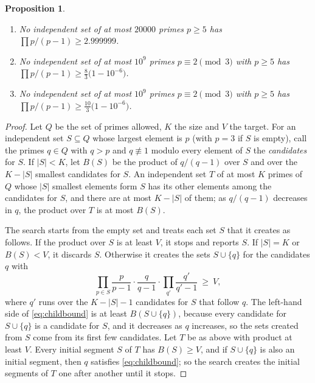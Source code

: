 \documentclass[11pt,reqno]{amsart}
\numberwithin{equation}{section}
\theoremstyle{plain}
\newtheorem{proposition}[theorem]{Proposition}
\theoremstyle{definition}
\theoremstyle{remark}
\begin{document}
\begin{proposition}\label{prop:indep}
\begin{enumerate}[label=\textup{(\roman*)}]
\item No independent set of at most $20000$ primes $p\ge5$ has
  $\prod p/(p-1)\ge2.999999$.
\item No independent set of at most $10^9$ primes $p\equiv2\pmod3$
  with $p\ge5$ has $\prod p/(p-1)\ge\frac83\bigl(1-10^{-6}\bigr)$.
\item No independent set of at most $10^9$ primes $p\equiv2\pmod3$
  with $p\ge5$ has $\prod p/(p-1)\ge\frac{10}3\bigl(1-10^{-6}\bigr)$.
\end{enumerate}
\end{proposition}

\begin{proof}
Let $Q$ be the set of primes allowed, $K$ the size and $V$ the target.
For an independent set $S\subseteq Q$ whose largest element is $p$
(with $p=3$ if $S$ is empty), call the primes $q\in Q$ with $q>p$ and
$q\not\equiv1$ modulo every element of $S$ the \emph{candidates} for
$S$. If $|S|<K$, let $B(S)$ be the product of $q/(q-1)$ over $S$ and
over the $K-|S|$ smallest candidates for $S$. An independent set $T$
of at most $K$ primes of $Q$ whose $|S|$ smallest elements form $S$
has its other elements among the candidates for $S$, and there are at
most $K-|S|$ of them; as $q/(q-1)$ decreases in $q$, the product over
$T$ is at most $B(S)$.

The search starts from the empty set and treats each set $S$ that it
creates as follows. If the product over $S$ is at least $V$, it stops
and reports $S$. If $|S|=K$ or $B(S)<V$, it discards $S$. Otherwise it
creates the sets $S\cup\{q\}$ for the candidates $q$ with
\begin{equation}\label{eq:childbound}
  \prod_{p\in S}\frac{p}{p-1}\cdot\frac{q}{q-1}\cdot
  \prod_{q'}\frac{q'}{q'-1}\ \ge\ V ,
\end{equation}
where $q'$ runs over the $K-|S|-1$ candidates for $S$ that follow $q$.
The left-hand side of \eqref{eq:childbound} is at least
$B(S\cup\{q\})$, because every candidate for $S\cup\{q\}$ is a
candidate for $S$, and it decreases as $q$ increases, so the sets
created from $S$ come from its first few candidates. Let $T$ be as
above with product at least $V$. Every initial segment $S$ of $T$ has
$B(S)\ge V$, and if $S\cup\{q\}$ is also an initial segment, then $q$
satisfies \eqref{eq:childbound}; so the search creates the initial
segments of $T$ one after another until it stops.


\end{proof}
\end{document}
